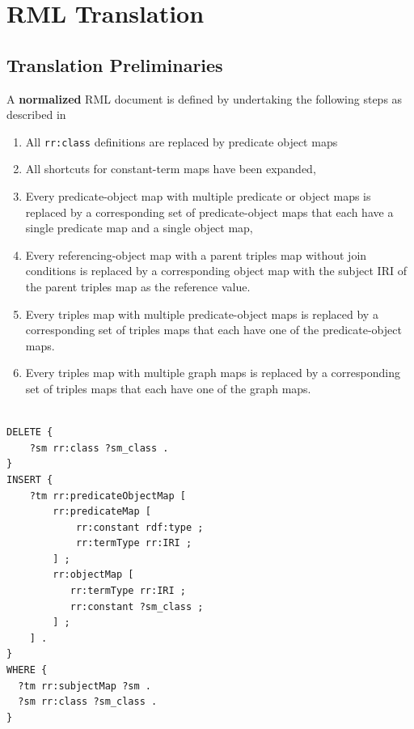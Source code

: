 \section{RML Translation}%
\label{sec:rml_translation}

\subsection{Translation Preliminaries}%
\label{sub:translation_preliminaries}


\begin{definition}
	A \textbf{normalized} RML document is defined by undertaking the following steps as described
	in~\citeneeded
	\begin{enumerate}
        \item All \texttt{rr:class} definitions are replaced by predicate object maps
		\item All shortcuts for constant-term maps have been expanded,
		\item Every predicate-object map with multiple predicate or object
		      maps is replaced by a corresponding set of predicate-object maps that each have a single
		      predicate map and a single object map,
		\item Every referencing-object map with a parent triples map without join
              conditions is replaced by a corresponding object map with the 
              subject IRI of the parent triples map as the reference value.
		\item Every triples map with multiple predicate-object maps is
		      replaced by a corresponding set of triples maps that each have one of
		      the predicate-object maps.
        \item Every triples map with multiple graph maps is replaced by a
              corresponding set of triples maps that each have one of the graph
              maps.
	\end{enumerate}
\end{definition}

\begin{lstlisting}[language=sparql, caption={SPARQL update query to replace \texttt{rr:class} 
definitions with predicate object maps},
label={lst:sparql_class_expand}, float=ht]

DELETE {
    ?sm rr:class ?sm_class .
}
INSERT {
    ?tm rr:predicateObjectMap [
        rr:predicateMap [
            rr:constant rdf:type ;
            rr:termType rr:IRI ;
        ] ;
        rr:objectMap [
           rr:termType rr:IRI ;
           rr:constant ?sm_class ;
        ] ;
    ] .
}
WHERE {
  ?tm rr:subjectMap ?sm . 
  ?sm rr:class ?sm_class .
}
\end{lstlisting}


